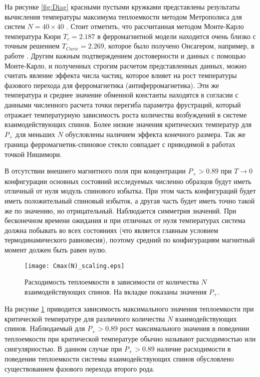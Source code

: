 На рисунке \ref{fig:Diag} красными пустыми кружками представлены результаты вычисления температуры максимума теплоемкости методом Метрополиса для систем $N=40\times40$  \cite{Metropolis53}. Стоит отметить, что рассчитанная методом Монте-Карло температура Кюри $T_{c}=2.187$ в ферромагнитной модели находится очень близко с точным решением $T_{Curie}=2.269$, которое было получено Онсагером, например, в работе \cite{Zaiman1953}. Другим важным подтверждением достоверности и данных с помощью Монте-Карло, и полученных строгим расчетом представленных данных, можно считать явление эффекта числа частиц, которое влияет на рост температуры фазового перехода для ферромагнетика (антиферромагнетика). Эти же температура и среднее значение обменной константы находятся в согласии с данными численного расчета точки перегиба параметра фрустраций, который отражает температурную зависимость роста количества возбуждений в системе взаимодействующих спинов. Более низкие значения критических температур для $P_+$ для меньших $N$ обусловлены наличием эффекта конечного размера. Так же граница ферромагнетик-спиновое стекло совпадает с приводимой в работах \cite{Hasenbusch2008, nishimori1980exact} точкой Нишимори.

В отсутствии внешнего магнитного поля при концентрации $P_{+}>0.89$ при $T \rightarrow0$ конфигурации основных состояний исследуемых численно образцов будут иметь отличный от нуля модуль спинового избытка. При этом часть конфигураций будет иметь положительный спиновый избыток, а другая часть будет иметь точно такой же по значению, но отрицательный. Наблюдается симметрия значений. При бесконечном времени ожидания и при отличных от нуля температурах система должна побывать во всех состояниях (что является главным условием термодинамического равновесия), поэтому средний по конфигурациям магнитный момент должен быть равен нулю. 

\begin{figure}[!ht]
	\centering
	\texttt{[image: Cmax(N)\_scaling.eps]}
	\caption{Расходимость теплоемкости в зависимости от количества  $N$ взаимодействующих спинов. На вкладке показаны значения $P_+$.}
	\label{fig:Cmax(N)_scaling}
\end{figure}

На рисунке \ref{fig:Cmax(N)_scaling} приводится зависимость максимального значения теплоемкости при критической температуре для различного количества $N$ взаимодействующих спинов. Наблюдаемый для $P_+>0.89$ рост максимального значения в поведении теплоемкости при критической температуре обычно называют расходимостью или сингулярностью. В данном случае при $P_+>0.89$ наличие расходимости в поведении теплоемкости системы взаимодействующих спинов обусловлено существованием фазового перехода второго рода. 


